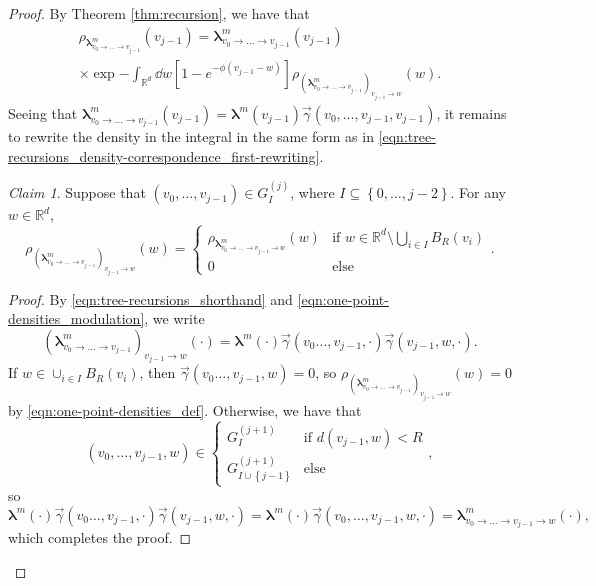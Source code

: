 \documentclass[11pt]{article}
\newcommand{\R}{\mathbb R}
\newcommand{\bl}{\bm{\lambda}}
\newcommand{\hcconst}{R}
\newcommand{\set}[1]{\left\{#1\right\}}
\numberwithin{equation}{section}
\theoremstyle{plain}
\theoremstyle{definition}
\theoremstyle{remark}
\newtheorem{claim}[theorem]{Claim}
\begin{document}
\begin{proof}
By Theorem \ref{thm:recursion}, we have that
\begin{equation}
\label{eqn:tree-recursions_density-correspondence_density-recurion}
\begin{multlined}
\rho_{\bl^{m}_{v_{0}\rightarrow\dots\rightarrow v_{j-1}}}(v_{j-1})
=\bl^{m}_{v_{0}\rightarrow\dots\rightarrow v_{j-1}}(v_{j-1})
\\
\times\exp{-\int_{\R^{d}}\dd{w}\left[1-e^{-\phi(v_{j-1}-w)}\right]\rho_{(\bl^{m}_{v_{0}\rightarrow\dots\rightarrow v_{j-1}})_{v_{j-1}\rightarrow w}}(w)}.
\end{multlined}
\end{equation}
Seeing that $\bl^{m}_{v_{0}\rightarrow\dots\rightarrow v_{j-1}}(v_{j-1})=\bl^{m}(v_{j-1})\vec{\gamma}(v_{0},\dots,v_{j-1},v_{j-1})$, it remains to rewrite the density in the integral in the same form as in \eqref{eqn:tree-recursions_density-correspondence_first-rewriting}.

\begin{claim}
Suppose that $(v_{0},\dots,v_{j-1})\in G^{(j)}_{I}$, where $I\subseteq\set{0,\dots,j-2}$.
For any $w\in\R^{d}$,
\begin{equation}
\label{eqn:tree-recursions_density-correspondence_density-rewriting}
\rho_{(\bl^{m}_{v_{0}\rightarrow\dots\rightarrow v_{j-1}})_{v_{j-1}\rightarrow w}}(w)
=\begin{cases}
\rho_{\bl^{m}_{v_{0}\rightarrow\dots\rightarrow v_{j-1}\rightarrow w}}(w) & \text{if }w\in\R^{d}\setminus\bigcup_{i\in I}B_{\hcconst}(v_{i}) \\
0 & \text{else}
\end{cases}.
\end{equation}
\end{claim}

\begin{proof}
By \eqref{eqn:tree-recursions_shorthand} and \eqref{eqn:one-point-densities_modulation}, we write
\begin{equation}
(\bl^{m}_{v_{0}\rightarrow\dots\rightarrow v_{j-1}})_{v_{j-1}\rightarrow w}(\cdot)
=\bl^{m}(\cdot)\vec{\gamma}(v_{0}\dots,v_{j-1},\cdot)\vec{\gamma}(v_{j-1},w,\cdot).
\end{equation}
If $w\in\cup_{i\in I}B_{\hcconst}(v_{i})$, then $\vec{\gamma}(v_{0}\dots,v_{j-1},w)=0$, so $\rho_{(\bl^{m}_{v_{0}\rightarrow\dots\rightarrow v_{j-1}})_{v_{j-1}\rightarrow w}}(w)=0$ by \eqref{eqn:one-point-densities_def}.
Otherwise, we have that
\begin{equation}
(v_{0},\dots,v_{j-1},w)\in
\begin{cases}
G^{(j+1)}_{I} & \text{if }d(v_{j-1},w)<\hcconst \\
G^{(j+1)}_{I\cup\set{j-1}} & \text{else}
\end{cases},
\end{equation}
so 
\begin{equation}
\bl^{m}(\cdot)\vec{\gamma}(v_{0}\dots,v_{j-1},\cdot)\vec{\gamma}(v_{j-1},w,\cdot)
=\bl^{m}(\cdot)\vec{\gamma}(v_{0},\dots,v_{j-1},w,\cdot)
=\bl^{m}_{v_{0}\rightarrow\dots\rightarrow v_{j-1}\rightarrow w}(\cdot),
\end{equation}
which completes the proof.
\end{proof}


\end{proof}
\end{document}
